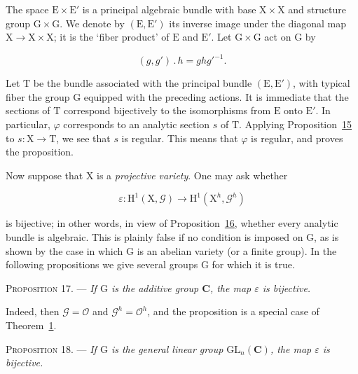 The space $\mathrm{E}\times \mathrm{E}'$ is a principal algebraic bundle with base
$\mathrm{X}\times \mathrm{X}$ and structure group $\mathrm{G}\times \mathrm{G}$. We denote by $(\mathrm{E},\mathrm{E}')$ its
inverse image under the diagonal map $\mathrm{X}\to \mathrm{X}\times \mathrm{X}$; it is the `fiber
product' of $\mathrm{E}$ and $\mathrm{E}'$. Let $\mathrm{G}\times \mathrm{G}$ act on $\mathrm{G}$ by

\begin{equation*}
(g,g')\mathbin{.}h=gh{g'}^{-1}.
\end{equation*}

Let $\mathrm{T}$ be the bundle associated with the principal bundle
$(\mathrm{E},\mathrm{E}')$, with typical fiber the group $\mathrm{G}$ equipped with the preceding
actions. It is immediate that the sections of $\mathrm{T}$ correspond bijectively to
the isomorphisms from $\mathrm{E}$ onto $\mathrm{E}'$. In particular, $\varphi$ corresponds to
an analytic section $s$ of $\mathrm{T}$. Applying Proposition~\hyperref[gaga:prop:15]{15}
to $s:\mathrm{X}\to \mathrm{T}$, we see that $s$ is regular. This means that $\varphi$ is
regular, and proves the proposition.

Now suppose that $\mathrm{X}$ is a \emph{projective variety}. One may ask whether

\begin{equation*}
\varepsilon:\mathrm{H}^1(\mathrm{X},\mathcal{G})
\longrightarrow\mathrm{H}^1(\mathrm{X}^h,\mathcal{G}^h)
\end{equation*}

is bijective; in other words, in view of Proposition~\hyperref[gaga:prop:16]{16},
whether every analytic bundle is algebraic. This is plainly false if no
condition is imposed on $\mathrm{G}$, as is shown by the case in which $\mathrm{G}$ is an
abelian variety (or a finite group). In the following propositions we give
several groups $\mathrm{G}$ for which it is true.

\textsc{Proposition 17}. --- \emph{If $\mathrm{G}$ is the
additive group $\mathbf{C}$, the map $\varepsilon$ is bijective.}

Indeed, then $\mathcal{G}=\mathcal{O}$ and
$\mathcal{G}^h=\mathcal{O}^h$, and the proposition is a special case of
Theorem~\hyperref[gaga:thm:1]{1}.

\textsc{Proposition 18}. --- \emph{If $\mathrm{G}$ is the
general linear group $\mathrm{GL}_n(\mathbf{C})$, the map $\varepsilon$ is
bijective.}

